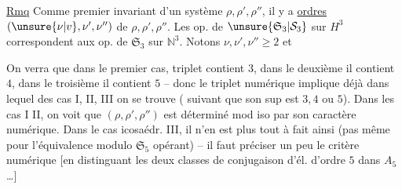 
\uline{Rmq} Comme premier invariant d'un système $\rho,\rho',\rho''$, il y a   \uline{ordres} $(\unsure{\nu|v},\nu',\nu'')$ de $\rho,\rho',\rho''$. Les op. de $\unsure{\mathfrak S_3|\mathcal S_3}$ sur $H^3$ correspondent  aux op. de $\mathfrak S_3$ sur $\mathbb N^3$. Notons $\nu,\nu',\nu''\geq 2$ et


On verra que dans le premier cas,  triplet contient  $3$, dans le deuxième il contient $4$, dans le troisième il contient $5$ -- donc le triplet numérique implique déjà dans lequel des cas I, II, III on se trouve ( suivant que son sup est $3,4$ ou $5$). Dans les cas I II, on voit que $(\rho,\rho',\rho'')$ est déterminé mod iso par son caractère numérique. Dans le cas icosaédr. III, il n'en est plus tout à fait ainsi (pas même pour l'équivalence modulo $\mathfrak S_5$ opérant) -- il faut préciser un peu le critère numérique [en distinguant les deux classes de conjugaison d'él. d'ordre $5$ dans $A_5$ \ldots]



